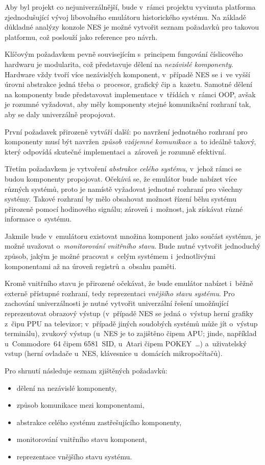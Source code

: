 Aby byl projekt co nejuniverzálnější, bude v~rámci projektu vyvinuta platforma zjednodušující vývoj libovolného emulátoru historického systému. Na základě důkladné analýzy konzole NES je možné vytvořit seznam požadavků pro takovou platformu, což poslouží jako reference pro návrh.

Klíčovým požadavkem pevně souvisejícím s~principem fungování číslicového hardwaru je modularita, což představuje dělení na \emph{nezávislé komponenty}. Hardware vždy tvoří více nezávislých komponent, v~případě NES se i~ve vyšší úrovni abstrakce jedná třeba o~procesor, grafický čip a~kazetu. Samotné dělení na komponenty bude představovat implementace v~třídách v~rámci OOP, avšak je rozumné vyžadovat, aby měly komponenty stejné komunikační rozhraní tak, aby se daly univerzálně propojovat.

První požadavek přirozeně vytváří další: po navržení jednotného rozhraní pro komponenty musí být navržen \emph{způsob vzájemné komunikace} a~to ideálně takový, který odpovídá skutečné implementaci a~zároveň je rozumně efektivní.

Třetím požadavkem je vytvoření \emph{abstrakce celého systému}, v~jehož rámci se budou komponenty propojovat. Očekává se, že emulátor bude nabízet více různých systémů, proto je namístě vyžadovat jednotné rozhraní pro všechny systémy. Takové rozhraní by mělo obsahovat možnost řízení běhu systému přirozeně pomocí hodinového signálu; zároveň i~možnost, jak získávat různé informace o~systému.

Jakmile bude v~emulátoru existovat množina komponent jako součást systému, je možné uvažovat o~\emph{monitorování vnitřního stavu}. Bude nutné vytvořit jednoduchý způsob, jakým je možné pracovat s~celým systémem i~jednotlivými komponentami až na úroveň registrů a~obsahu paměti.

Kromě vnitřního stavu je přirozené očekávat, že bude emulátor nabízet i~běžně externě přístupné rozhraní, tedy reprezentaci \emph{vnějšího stavu systému}. Pro zachování univerzálnosti je nutné vytvořit univerzální řešení umožňující reprezentovat obrazový výstup (v~případě NES se jedná o~výstup herní grafiky z~čipu PPU na televizor; v~případě jiných soudobých systémů může jít o~výstup terminálu), zvukový výstup (u~NES je to zajištěno čipem APU; jinde, například u~Commodore~64 čipem 6581~SID, u~Atari čipem POKEY~\dots) a~uživatelský vstup (herní ovladače u~NES, klávesnice u~domácích mikropočítačů).

Pro shrnutí následuje seznam zjištěných požadavků:
\begin{itemize}
	\item dělení na nezávislé komponenty,
	\item způsob komunikace mezi komponentami,
	\item abstrakce celého systému zastřešujícího komponenty,
	\item monitorování vnitřního stavu komponent,
	\item reprezentace vnějšího stavu systému.
\end{itemize}

